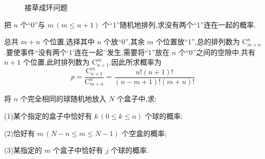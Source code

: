 \begin{solution}
\begin{figure}[H]

        \caption{接草成环问题}
        \label{fig:例题-接草成环问题}
    \end{figure}
\end{solution}

\question\label{n个0与m个1} 把 $n$ 个``0''与 $m \, (m \leqslant n+1)$ 个``1''随机地排列,求没有两个``1''连在一起的概率.

\begin{solution}
    总共 $m+n$ 个位置,选择其中 $n$ 个放``0'',其余 $m$ 个位置放``1'',总的排列数为 $\mathrm{C}_{m+n}^n$.要使事件``没有两个`1'连在一起''发生,需要将``1''放在 $n$ 个``0''之间的空隙中,共有 $n+1$ 个位置,此时排列数为 $\mathrm{C}_{n+1}^m$.因此所求概率为
    $$
    p = \dfrac{\mathrm{C}_{n+1}^m}{\mathrm{C}_{m+n}^n} = \dfrac{n! (n+1)!}{(n-m+1)! (m+n)!}
    $$
\end{solution}

\question[插板法] 将 $n$ 个完全相同的球随机地放入 $N$ 个盒子中,求:

(1)某个指定的盒子中恰好有 $k \, (0 \leqslant k \leqslant n)$ 个球的概率;

(2)恰好有 $m \, (N-n \leqslant m \leqslant N-1)$ 个空盒的概率;

(3)某指定的 $m$ 个盒子中恰好有 $j$ 个球的概率.

